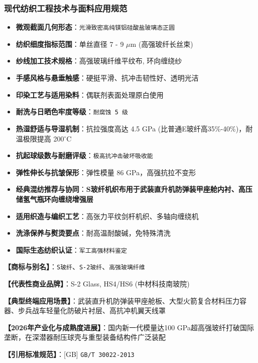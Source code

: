 \documentclass[11pt,openright,twoside,UTF8]{ctexbook}
\begin{document}
\subsubsection*{现代纺织工程技术与面料应用规范}
\begin{itemize} \setlength{\itemsep}{2pt}
    \item \textbf{微观截面几何形态}：\texttt{光滑致密高纯镁铝硅酸盐玻璃态正圆}
    \item \textbf{纺织细度指标范围}：单丝直径 7 - 9 $\mu$m (高强玻纤长丝束)
    \item \textbf{纱线加工技术规格}：高强玻璃纤维平纹布, 环向缠绕纱
    \item \textbf{手感风格与悬垂触感}：硬挺平滑、抗冲击韧性好、透明光洁
    \item \textbf{印染工艺与适用染料}：偶联剂表面处理原白使用
    \item \textbf{耐洗与日晒色牢度等级}：\texttt{耐腐蚀 5 级}
    \item \textbf{热湿舒适与导湿机制}：抗拉强度高达 4.5 GPa (比普通E玻纤高35\%-40\%)，耐温极限提高 200$^\circ\mathrm{C}$
    \item \textbf{抗起球级数与耐磨评级}：\texttt{极高抗冲击破坏吸收能}
    \item \textbf{弹性伸长与抗皱保形}：弹性模量 86 GPa，高强抗拉不变形
    \item \textbf{经典混纺推荐与协同}：\textbf{S玻纤机织布用于武装直升机防弹装甲座舱内衬、高压储氢气瓶环向缠绕增强层}
    \item \textbf{适用织造与编织工艺}：高张力平纹剑杆机织、多轴向缠绕机
    \item \textbf{洗涤保养与熨烫要点}：耐高温耐酸碱，免特殊清洗
    \item \textbf{国际生态纺织认证}：\texttt{军工高强材料鉴定}
\end{itemize}
\vspace{0.2cm}

\noindent\textbf{【商标与别名】}：\texttt{S玻纤}、\texttt{S-2玻纤}、\texttt{高强玻璃纤维}\par
\noindent\textbf{【代表性商业品牌】}：S-2 Glass, HS4/HS6 (中材科技南玻院)\par
\noindent\textbf{【典型终端应用场景】}：武装直升机防弹装甲座舱板、大型火箭复合材料压力容器、步兵战车轻量化防破片衬层、高抗冲机翼天线罩\par
\noindent\textbf{【2026年产业化与成熟度进展】}：国内新一代模量达100 GPa超高强玻纤打破国际垄断，在深潜器耐压球壳与重型装备结构件广泛装配\par
\noindent\textbf{【引用标准规范】}：[GB] \texttt{GB/T 30022-2013}\par
\vspace{0.5cm}
\end{document}
